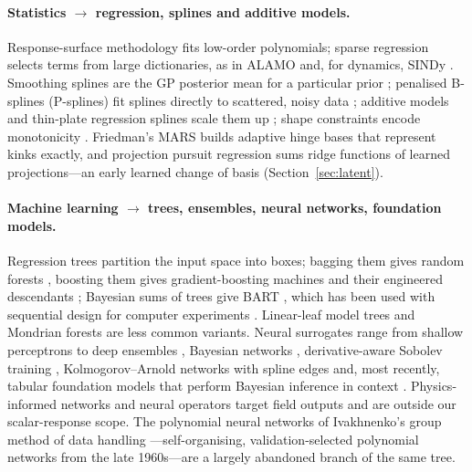 \paragraph{Statistics $\rightarrow$ regression, splines and additive models.}
Response-surface methodology \cite{box1951experimental} fits low-order polynomials; sparse regression
\cite{tibshirani1996regression} selects terms from large dictionaries, as in ALAMO \cite{cozad2014alamo} and, for
dynamics, SINDy \cite{brunton2016discovering}. Smoothing splines are the GP posterior mean for a particular prior
\cite{kimeldorf1970correspondence,wahba1990spline}; penalised B-splines (P-splines) fit splines directly to scattered,
noisy data \cite{eilers1996flexible}; additive models and thin-plate regression splines scale them up
\cite{hastie1990generalized,wood2003thin}; shape constraints encode monotonicity
\cite{fritsch1980monotone,pya2015shape}. Friedman's MARS \cite{friedman1991multivariate} builds adaptive hinge bases
that represent kinks exactly, and projection pursuit regression \cite{friedman1981projection} sums ridge functions
of learned projections---an early learned change of basis (Section~\ref{sec:latent}).

\paragraph{Machine learning $\rightarrow$ trees, ensembles, neural networks, foundation models.}
Regression trees \cite{breiman1984classification} partition the input space into boxes; bagging them gives random
forests \cite{breiman2001random,biau2016random}, boosting them gives gradient-boosting machines
\cite{friedman2001greedy} and their engineered descendants \cite{chen2016xgboost,ke2017lightgbm,prokhorenkova2018catboost};
Bayesian sums of trees give BART \cite{chipman2010bart}, which has been used with sequential design for computer
experiments \cite{chipman2012sequential}. Linear-leaf model trees \cite{quinlan1992learning} and Mondrian forests
\cite{lakshminarayanan2014mondrian} are less common variants. Neural surrogates range from shallow perceptrons to deep
ensembles \cite{lakshminarayanan2017simple}, Bayesian networks \cite{mackay1992practical,neal1996bayesian,daxberger2021laplace},
derivative-aware Sobolev training \cite{czarnecki2017sobolev}, Kolmogorov--Arnold networks with spline edges
\cite{liu2024kan} and, most recently, tabular foundation models that perform Bayesian inference in context
\cite{hollmann2025tabpfn}. Physics-informed networks and neural operators \cite{raissi2019physics,lu2021deeponet,li2021fourier}
target field outputs and are outside our scalar-response scope. The polynomial neural networks of Ivakhnenko's group
method of data handling \cite{ivakhnenko1971polynomial}---self-organising, validation-selected polynomial networks from
the late 1960s---are a largely abandoned branch of the same tree.


